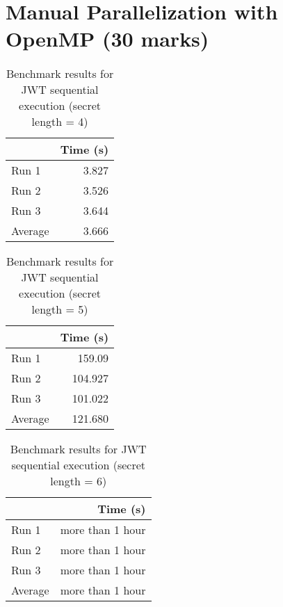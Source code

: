 \documentclass[12pt]{article}
\begin{document}

\section*{Manual Parallelization with OpenMP (30 marks)}

\begin{table}[H]
  \centering
  \begin{tabular}{lr}
    & {\bf Time (s)} \\
    \hline
    Run 1 & 3.827 \\
    Run 2 & 3.526 \\
    Run 3 & 3.644 \\
    \hline
    Average & 3.666 \\
  \end{tabular}
  \caption{Benchmark results for JWT sequential execution (secret length = 4)}
  \label{tbl-zeta-openmp}
\end{table}

\begin{table}[H]
  \centering
  \begin{tabular}{lr}
    & {\bf Time (s)} \\
    \hline
    Run 1 & 159.09 \\
    Run 2 & 104.927 \\
    Run 3 & 101.022 \\
    \hline
    Average & 121.680 \\
  \end{tabular}
  \caption{Benchmark results for JWT sequential execution (secret length = 5)}
  \label{tbl-zeta-openmp}
\end{table}

\begin{table}[H]
  \centering
  \begin{tabular}{lr}
    & {\bf Time (s)} \\
    \hline
    Run 1 & more than 1 hour \\
    Run 2 & more than 1 hour \\
    Run 3 & more than 1 hour \\
    \hline
    Average & more than 1 hour \\
  \end{tabular}
  \caption{Benchmark results for JWT sequential execution (secret length = 6)}
  \label{tbl-zeta-openmp}
\end{table}
\end{document}

